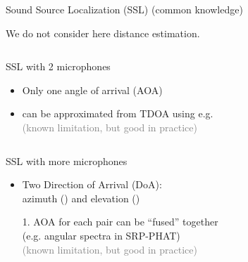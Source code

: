 \begin{frame}{Sound Source Localization (SSL) {\hfill\small (common knowledge)} \faBook}

    \faAlert We do not consider here distance estimation.

    \begin{columns}[T,onlytextwidth]
        \begin{block}{SSL with 2 microphones}
            \begin{itemize}
                \item Only one angle of arrival (\alert{AOA})\iconAOA
                \item can be approximated from \alert{TDOA} using e.g. \GCCPHAT\footnotemark[1]
                \\\textcolor{gray}{\small (known limitation, but good in practice)}
            \end{itemize}
        \end{block}
    \end{columns}
    \pause

    \begin{columns}[T,onlytextwidth]
        \begin{block}{SSL with more microphones}
            \begin{itemize}
                \item Two Direction of Arrival (DoA):
                \\azimuth (\faArrowsAltH) and elevation (\faArrowsAltV)
                \item[1.] AOA for each pair can be ``fused'' together
                \\(e.g. angular spectra in SRP-PHAT\footnotemark[2])
                \\\textcolor{gray}{\small (known limitation, but good in practice)}
            \end{itemize}
        \end{block}
    \end{columns}


\end{frame}

